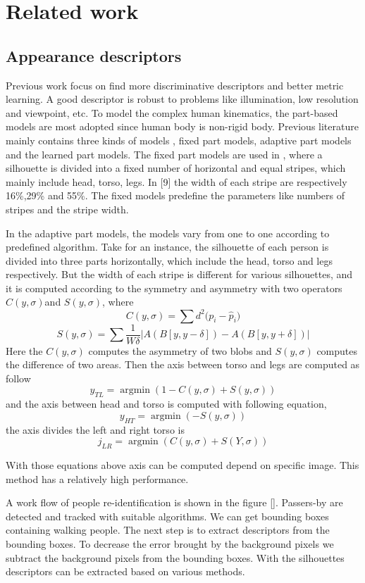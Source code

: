 \chapter{Related work}


\section{Appearance descriptors}
Previous work focus on find more discriminative descriptors and better metric learning. A good descriptor is robust to problems like illumination, low resolution and viewpoint, etc.
To model the complex human kinematics, the part-based models are most adopted since human body is non-rigid body. Previous literature mainly contains three kinds of models \cite{AppearanceDesc}, fixed part models, adaptive part models and the learned part models. The fixed part models are used in \cite{}, where a silhouette is divided into a fixed number of horizontal and equal stripes, which mainly include head, torso, legs. In [9] the width of each stripe are respectively 16\%,29\% and 55\%.  The fixed models predefine the parameters like numbers of stripes and the stripe width. 

In the adaptive part models, the models vary from one to one according to predefined algorithm. Take \cite{SDALF} for an instance, the silhouette of each person is divided into three parts horizontally, which include the head, torso and legs respectively. But the width of each stripe is different for various silhouettes, and it is computed according to the symmetry and asymmetry with two operators $C(y, \sigma) $and $S(y,\sigma)$, where 
$$C(y,\sigma) = \sum{d^2(p_i-{\hat{p}_i)}}$$
$$S(y,\sigma) = \sum{\frac{1}{W\delta}|A(B[y,y-\delta]) - A(B[y,y+\delta])|}$$
Here the $C(y, \sigma) $ computes the asymmetry of two blobs and $S(y,\sigma)$ computes the difference of two areas. Then the axis between torso and legs are computed as follow
$$y_{TL} = \mathop{\arg\min}(1-C(y,\sigma)+S(y,\sigma))$$
and the axis  between head and torso is computed with following equation,
$$y_{HT} = \mathop{\arg\min}(-S(y,\sigma))$$
the axis divides the left and right torso is
$$ j_{LR} = \mathop{\arg\min}(C(y,\sigma)+S(Y,\sigma))$$

With those equations above axis can be computed depend on specific image. This method has a relatively high performance.

A work flow of people re-identification is shown in the figure []. Passers-by are detected and tracked with suitable algorithms. We can get bounding boxes containing walking people. The next step is to extract descriptors from the bounding boxes. To decrease the error brought by the background pixels we subtract the background pixels from the bounding boxes. With the silhouettes descriptors can be extracted based on various methods.  

